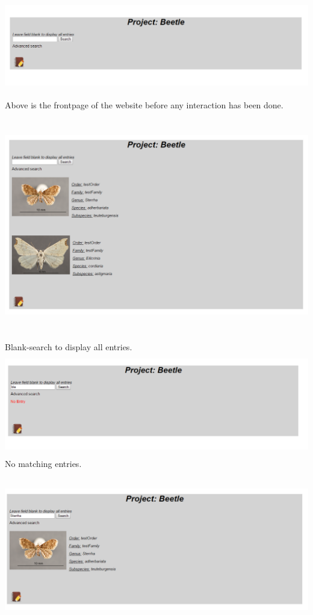 \documentclass[12pt,a4paper]{article}
\begin{document}
\includegraphics[height=45mm]{Beetle1.png}\\
Above is the frontpage of the website before any interaction has been done.\\
\includegraphics[height=100mm]{Beetle2.png}\\
Blank-search to display all entries.\\
\includegraphics[height=45mm]{Beetle3.png}\\
No matching entries.\\
\includegraphics[height=70mm]{Beetle4.png}\\
\end{document}
